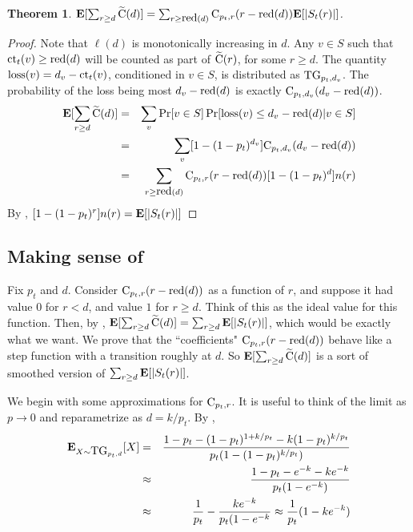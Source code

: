 \documentclass[11pt]{article}
\newtheorem{theorem}{Theorem}
\theoremstyle{definition}
\newcommand{\EX}{\hbox{\bf E}}
\newcommand{\tC}{\widetilde{\hbox{C}}}
\newcommand{\ct}{\hbox{ct}}
\newcommand{\tg}{\hbox{TG}}
\newcommand{\cdf}{\hbox{C}}
\newcommand{\rd}{{\hbox{red}}}
\newcommand{\loss}{{\hbox{loss}}}
\newcommand{\mult}{k}
\begin{document}
\begin{theorem} \label{thm:tc} $\EX[\sum_{r \geq d} \tC(d)] = \sum_{r \geq \rd(d)} \cdf_{p_t,r}(r-\rd(d)) \EX[|S_t(r)|]$.
\end{theorem}

\begin{proof} Note that $\ell(d)$ is monotonically increasing in $d$.
Any $v \in S$ such that $\ct_t(v) \geq \rd(d)$ will be counted as part of $\tC(r)$, for some
$r \geq d$. The quantity $\loss(v) = d_v - \ct_t(v)$, conditioned in $v \in S$, is distributed as $\tg_{p_t,d_v}$.
The probability of the loss being most $d_v - \rd(d)$ is exactly $\cdf_{p_t,d_v}(d_v - \rd(d))$.
\begin{eqnarray*}
    \EX[\sum_{r \geq d} \tC(d)] & = & \sum_v \Pr[v \in S] \Pr[\loss(v) \leq d_v - \rd(d) | v \in S] \\
    & = & \sum_v [1-(1-p_t)^{d_v}] \cdf_{p_t,d_v}(d_v - \rd(d)) \\
    & = &\sum_{r \geq \rd(d)} \cdf_{p_t,r}(r-\rd(d)) [1-(1-p_t)^d] n(r)
\end{eqnarray*}
By , $[1-(1-p_t)^r]n(r) = \EX[|S_t(r)|]$
\end{proof}

\subsection{Making sense of } \label{sec:tc}

Fix $p_t$ and $d$.
Consider $\cdf_{p_t,r}(r-\rd(d))$ as a function of $r$, and suppose it had value $0$ for $r < d$, and value $1$ for $r \geq d$.
Think of this as the ideal value for this function.
Then, by , $\EX[\sum_{r \geq d} \tC(d)] = \sum_{r \geq d}  \EX[|S_t(r)|]$, which
would be exactly what we want. We prove that the ``coefficients" $\cdf_{p_t,r}(r-\rd(d))$
behave like a step function with a transition roughly at $d$. So $\EX[\sum_{r \geq d} \tC(d)]$
is a sort of smoothed version of $\sum_{r \geq d} \EX[|S_t(r)|]$.

We begin with some approximations for $\cdf_{p_t,r}$. It is useful
to think of the limit as $p \rightarrow 0$
and reparametrize as $d = \mult/p_t$.
By ,
\begin{eqnarray*}
    \EX_{X \sim \tg_{p_t,d}}[X] & = & \frac{1 - p_t - (1-p_t)^{1+\mult/p_t} - \mult(1-p_t)^{\mult/p_t}}{p_t(1-(1-p_t)^{\mult/p_t})}\\
    & \approx & \frac{1 - p_t - e^{-\mult} - \mult e^{-\mult}}{p_t(1-e^{-\mult})} \\
    & \approx & \frac{1}{p_t} - \frac{\mult e^{-\mult}}{p_t(1-e^{-\mult}} \approx \frac{1}{p_t}(1-\mult e^{-\mult})
\end{eqnarray*}
\end{document}
